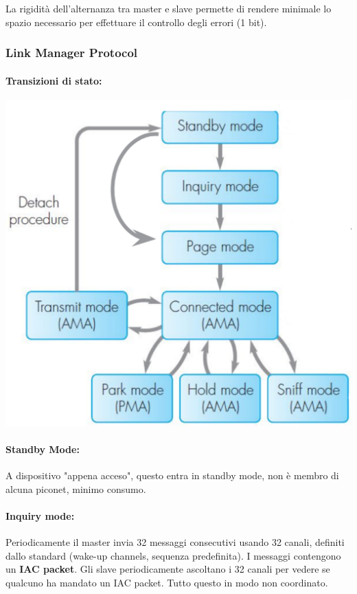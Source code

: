 La rigidità dell'alternanza tra master e slave permette di rendere minimale lo spazio necessario per effettuare il controllo degli errori (1 bit).

\subsubsection{Link Manager Protocol}
\paragraph{Transizioni di stato:}
\begin{center}
	\includegraphics[width=0.55\linewidth]{img/wpan/lmpst}
\end{center}

\paragraph{Standby Mode:} A dispositivo "appena acceso", questo entra in standby mode, non è membro di alcuna piconet, minimo consumo.

\paragraph{Inquiry mode:} Periodicamente il master invia 32 messaggi consecutivi usando 32 canali, definiti dallo standard (wake-up channels, sequenza  predefinita). I messaggi contengono un \textbf{IAC packet}. Gli slave periodicamente ascoltano i 32 canali per vedere se qualcuno ha mandato un IAC packet. Tutto questo in modo non coordinato.


